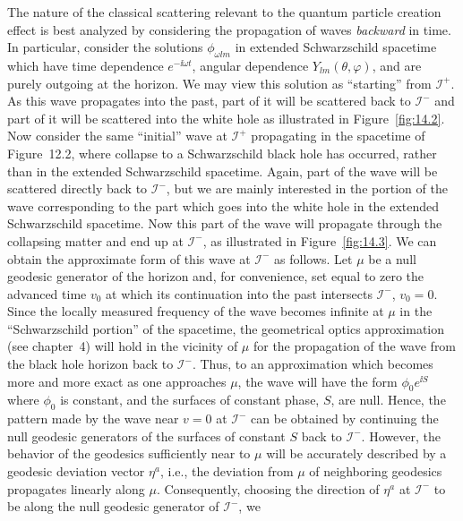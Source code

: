 The nature of the classical scattering relevant to the quantum particle creation
effect is best analyzed by considering the propagation of waves \emph{backward} in
time. In particular, consider the solutions \(\phi_{\omega lm}\) in extended
Schwarzschild spacetime which have time dependence \(e^{-\ii\omega t}\), angular
dependence \(Y_{lm}(\theta,\varphi)\), and are purely outgoing at the horizon. We
may view this solution as ``starting'' from \(\mathcal I^+\). As this wave propagates
into the past, part of it will be scattered back to \(\mathcal I^-\) and part of it will
be scattered into the white hole as illustrated in Figure~\ref{fig:14.2}. Now consider
the same ``initial'' wave at \(\mathcal I^+\) propagating in the spacetime of
Figure~12.2, where collapse to a Schwarzschild black hole has occurred, rather than
in the extended Schwarzschild spacetime. Again, part of the wave will be scattered
directly back to \(\mathcal I^-\), but we are mainly interested in the portion of the
wave corresponding to the part which goes into the white hole in the extended
Schwarzschild spacetime. Now this part of the wave will propagate through the
collapsing matter and end up at \(\mathcal I^-\), as illustrated in
Figure~\ref{fig:14.3}. We can obtain the approximate form of this wave at
\(\mathcal I^-\) as follows. Let \(\mu\) be a null geodesic generator of the horizon
and, for convenience, set equal to zero the advanced time \(v_0\) at which its
continuation into the past intersects \(\mathcal I^-\), \(v_0=0\). Since the locally
measured frequency of the wave becomes infinite at \(\mu\) in the ``Schwarzschild
portion'' of the spacetime, the geometrical optics approximation (see chapter~4) will
hold in the vicinity of \(\mu\) for the propagation of the wave from the black hole
horizon back to \(\mathcal I^-\). Thus, to an approximation which becomes more
and more exact as one approaches \(\mu\), the wave will have the form
\(\phi_0e^{\ii S}\) where \(\phi_0\) is constant, and the surfaces of constant phase,
\(S\), are null. Hence, the pattern made by the wave near \(v=0\) at
\(\mathcal I^-\) can be obtained by continuing the null geodesic generators of the
surfaces of constant \(S\) back to \(\mathcal I^-\). However, the behavior of the
geodesics sufficiently near to \(\mu\) will be accurately described by a geodesic
deviation vector \(\eta^a\), i.e., the deviation from \(\mu\) of neighboring geodesics
propagates linearly along \(\mu\). Consequently, choosing the direction of \(\eta^a\)
at \(\mathcal I^-\) to be along the null geodesic generator of \(\mathcal I^-\), we
